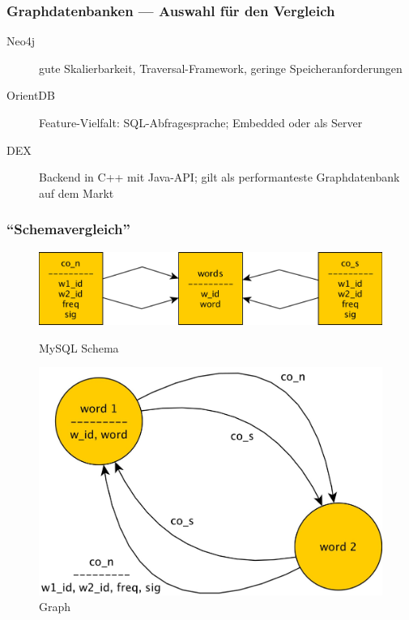 \documentclass{beamer}
\begin{document}
\begin{frame}\frametitle{Graphdatenbanken --- Auswahl für den Vergleich}
	\begin{description}
		\item[Neo4j] gute Skalierbarkeit, Traversal-Framework, geringe Speicheranforderungen
		\item[OrientDB] Feature-Vielfalt: SQL-Abfragesprache; Embedded oder als Server
		\item[DEX] Backend in C++ mit Java-API; gilt als performanteste Graphdatenbank auf dem Markt
	\end{description}
\end{frame}

\begin{frame}\frametitle{``Schemavergleich''}
\begin{figure}[ht]
\begin{minipage}[b]{0.45\linewidth}
\centering
\includegraphics[scale=0.03]{images/mysql_schema}
\caption{MySQL Schema}
\label{fig:mysql_schema}
\end{minipage}
\hspace{0.5cm}
\begin{minipage}[b]{0.45\linewidth}
\centering
\includegraphics[scale=0.1]{images/graph_schema}
\caption{Graph}
\label{fig:graph_schema}
\end{minipage}
\end{figure}
\end{frame}
\end{document}
